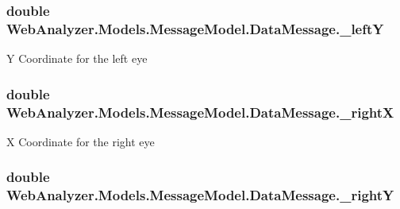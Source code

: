 \subsubsection[{\+\_\+left\+Y}]{\setlength{\rightskip}{0pt plus 5cm}double Web\+Analyzer.\+Models.\+Message\+Model.\+Data\+Message.\+\_\+left\+Y\hspace{0.3cm}{\ttfamily [private]}}\label{class_web_analyzer_1_1_models_1_1_message_model_1_1_data_message_a093686b36f2a672787a3d2a7b03709c8}


Y Coordinate for the left eye 

\hypertarget{class_web_analyzer_1_1_models_1_1_message_model_1_1_data_message_a2fea12857a3954edd96d248fa4dbb673}{}
\subsubsection[{\+\_\+right\+X}]{\setlength{\rightskip}{0pt plus 5cm}double Web\+Analyzer.\+Models.\+Message\+Model.\+Data\+Message.\+\_\+right\+X\hspace{0.3cm}{\ttfamily [private]}}\label{class_web_analyzer_1_1_models_1_1_message_model_1_1_data_message_a2fea12857a3954edd96d248fa4dbb673}


X Coordinate for the right eye 

\hypertarget{class_web_analyzer_1_1_models_1_1_message_model_1_1_data_message_a898ed683213c5e3ad74d42b9ecd4e590}{}
\subsubsection[{\+\_\+right\+Y}]{\setlength{\rightskip}{0pt plus 5cm}double Web\+Analyzer.\+Models.\+Message\+Model.\+Data\+Message.\+\_\+right\+Y\hspace{0.3cm}{\ttfamily [private]}}\label{class_web_analyzer_1_1_models_1_1_message_model_1_1_data_message_a898ed683213c5e3ad74d42b9ecd4e590}


